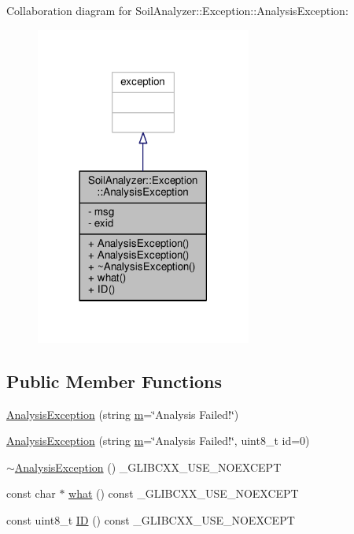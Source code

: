 Collaboration diagram for Soil\+Analyzer\+:\+:Exception\+:\+:Analysis\+Exception\+:\nopagebreak
\begin{figure}[H]
\begin{center}
\leavevmode
\includegraphics[width=201pt]{class_soil_analyzer_1_1_exception_1_1_analysis_exception__coll__graph}
\end{center}
\end{figure}
\subsection*{Public Member Functions}
\begin{DoxyCompactItemize}
\item 
\hyperlink{class_soil_analyzer_1_1_exception_1_1_analysis_exception_ade6cb9dc03a2439db908f17248dc0cd6}{Analysis\+Exception} (string \hyperlink{_gen_blob_8m_ab3cd915d758008bd19d0f2428fbb354a}{m}=\char`\"{}Analysis Failed!\char`\"{})
\item 
\hyperlink{class_soil_analyzer_1_1_exception_1_1_analysis_exception_a65bef8cb82ae9c1e9eae6584206c0cd3}{Analysis\+Exception} (string \hyperlink{_gen_blob_8m_ab3cd915d758008bd19d0f2428fbb354a}{m}=\char`\"{}Analysis Failed!\char`\"{}, uint8\+\_\+t id=0)
\item 
\hyperlink{class_soil_analyzer_1_1_exception_1_1_analysis_exception_a85776fdbacc6419c013eb5c17cab3bc9}{$\sim$\+Analysis\+Exception} () \+\_\+\+G\+L\+I\+B\+C\+X\+X\+\_\+\+U\+S\+E\+\_\+\+N\+O\+E\+X\+C\+E\+P\+T
\item 
const char $\ast$ \hyperlink{class_soil_analyzer_1_1_exception_1_1_analysis_exception_aaf17da7a2b20ed7ce40c4ed0ed457e20}{what} () const \+\_\+\+G\+L\+I\+B\+C\+X\+X\+\_\+\+U\+S\+E\+\_\+\+N\+O\+E\+X\+C\+E\+P\+T
\item 
const uint8\+\_\+t \hyperlink{class_soil_analyzer_1_1_exception_1_1_analysis_exception_abe426e05733688280876df37c491afff}{I\+D} () const \+\_\+\+G\+L\+I\+B\+C\+X\+X\+\_\+\+U\+S\+E\+\_\+\+N\+O\+E\+X\+C\+E\+P\+T
\end{DoxyCompactItemize}
